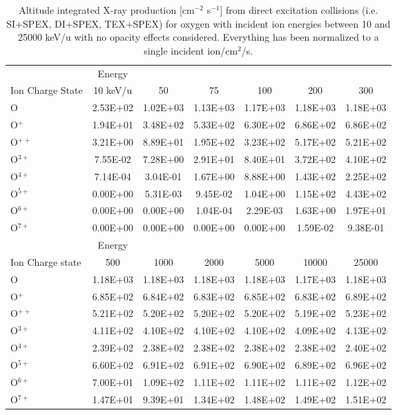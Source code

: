 \begin{table}
    \centering
    \begin{tabular}{l|c|c|c|c|c|c}
    \hline
    & Energy & & & & & \\
    Ion Charge State & 10 keV/u & 50 & 75 & 100 & 200 & 300 \\
    \hline
    O & 2.53E+02 & 1.02E+03 & 1.13E+03 & 1.17E+03 & 1.18E+03 & 1.18E+03 \\
    O$^+$ & 1.94E+01 & 3.48E+02 & 5.33E+02 & 6.30E+02 & 6.86E+02 & 6.86E+02 \\
    O$^{++}$ & 3.21E+00 & 8.89E+01 & 1.95E+02 & 3.23E+02 & 5.17E+02 & 5.21E+02 \\
    O$^{3+}$ & 7.55E-02 & 7.28E+00 & 2.91E+01 & 8.40E+01 & 3.72E+02 & 4.10E+02 \\
    O$^{4+}$ & 7.14E-04 & 3.04E-01 & 1.67E+00 & 8.88E+00 & 1.43E+02 & 2.25E+02 \\
    O$^{5+}$ & 0.00E+00 & 5.31E-03 & 9.45E-02 & 1.04E+00 & 1.15E+02 & 4.43E+02 \\
    O$^{6+}$ & 0.00E+00 & 0.00E+00 & 1.04E-04 & 2.29E-03 & 1.63E+00 & 1.97E+01 \\
    O$^{7+}$ & 0.00E+00 & 0.00E+00 & 0.00E+00 & 0.00E+00 & 1.59E-02 & 9.38E-01 \\
    \hline
    \hline
    & Energy & & & & & \\
    Ion Charge state & 500 & 1000 & 2000 & 5000 & 10000 & 25000 \\
    \hline
    O & 1.18E+03 & 1.18E+03 & 1.18E+03 & 1.18E+03 & 1.17E+03 & 1.18E+03 \\
    O$^+$ & 6.85E+02 & 6.84E+02 & 6.83E+02 & 6.85E+02 & 6.83E+02 & 6.89E+02 \\
    O$^{++}$ & 5.21E+02 & 5.20E+02 & 5.20E+02 & 5.20E+02 & 5.19E+02 & 5.23E+02 \\
    O$^{3+}$ & 4.11E+02 & 4.10E+02 & 4.10E+02 & 4.10E+02 & 4.09E+02 & 4.13E+02 \\
    O$^{4+}$ & 2.39E+02 & 2.38E+02 & 2.38E+02 & 2.38E+02 & 2.38E+02 & 2.40E+02 \\
    O$^{5+}$ & 6.60E+02 & 6.91E+02 & 6.91E+02 & 6.90E+02 & 6.89E+02 & 6.96E+02 \\
    O$^{6+}$ & 7.00E+01 & 1.09E+02 & 1.11E+02 & 1.11E+02 & 1.11E+02 & 1.12E+02 \\
    O$^{7+}$ & 1.47E+01 & 9.39E+01 & 1.34E+02 & 1.48E+02 & 1.49E+02 & 1.51E+02 \\
    \hline
    \end{tabular}
    \caption{Altitude integrated X-ray production [cm$^{-2}$ s$^{-1}$] from direct excitation collisions (i.e. SI+SPEX, DI+SPEX, TEX+SPEX) for oxygen with incident ion energies between 10 and 25000 keV/u with no opacity effects considered. Everything has been normalized to a single incident ion/cm$^2$/s.}
    \label{tab:my_label}
\end{table}